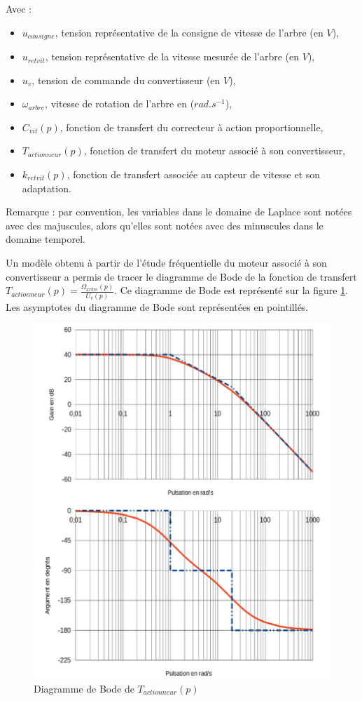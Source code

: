 Avec :
\begin{itemize}
 \item $u_{consigne}$, tension représentative de la consigne de vitesse de l'arbre (en $V$),
 \item $u_{retvit}$, tension représentative de la vitesse mesurée de l'arbre (en $V$),
 \item $u_v$, tension de commande du convertisseur (en $V$),
 \item $\omega_{arbre}$, vitesse de rotation de l'arbre en ($rad.s^{-1}$),
 \item $C_{vit}(p)$, fonction de transfert du correcteur à action proportionnelle,
 \item $T_{actionneur}(p)$, fonction de transfert du moteur associé à son convertisseur,
 \item $k_{retvit}(p)$, fonction de transfert associée au capteur de vitesse et son adaptation.
\end{itemize}

Remarque : par convention, les variables dans le domaine de Laplace sont notées avec des majuscules, alors qu'elles sont notées avec des minuscules dans le domaine temporel.

Un modèle obtenu à partir de l'étude fréquentielle du moteur associé à son convertisseur a permis de tracer le diagramme de Bode de la fonction de transfert $T_{actionneur}(p)=\frac{\Omega_{arbre}(p)}{U_v(p)}$. Ce diagramme de Bode est représenté sur la figure \ref{fig19}. Les asymptotes du diagramme de Bode sont représentées en pointillés.

\begin{figure}[!h]
 \centering\includegraphics[width=0.7\linewidth]{img/fig19}
 \caption{Diagramme de Bode de $T_{actionneur}(p)$}
 \label{fig19}
\end{figure}

